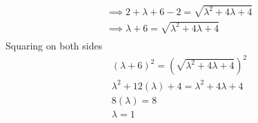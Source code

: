 \documentclass[10pt]{article}
\providecommand{\brak}[1]{\ensuremath{\left(#1\right)}}
\begin{document}
\begin{enumerate}
\begin{align}
\implies 2+\lambda+6-2 = {\sqrt{\lambda^2+4\lambda+4}} \\
\implies \lambda+6 = {\sqrt{\lambda^2+4\lambda+4}}\\
\end{align}
Squaring on both sides
\begin{align}
    \brak{\lambda+6}^2 = \brak{{\sqrt{\lambda^2+4\lambda+4}}}^2\\
    \lambda^2+12\brak{\lambda}+4 = \lambda^2+4\lambda+4\\
    8\brak{\lambda} = 8\\
    \lambda = 1
\end{align}
\end{enumerate}
\end{document}
